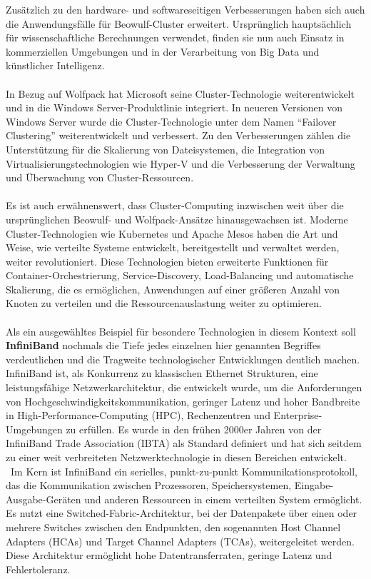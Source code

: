 Zusätzlich zu den hardware- und softwareseitigen Verbesserungen haben sich auch die Anwendungsfälle für Beowulf-Cluster erweitert. Ursprünglich hauptsächlich für wissenschaftliche Berechnungen verwendet, finden sie nun auch Einsatz in kommerziellen Umgebungen und in der Verarbeitung von Big Data und künstlicher Intelligenz.
\\\\
In Bezug auf Wolfpack hat Microsoft seine Cluster-Technologie weiterentwickelt und in die Windows Server-Produktlinie integriert. In neueren Versionen von Windows Server wurde die Cluster-Technologie unter dem Namen \enquote{Failover Clustering} weiterentwickelt und verbessert. Zu den Verbesserungen zählen die Unterstützung für die Skalierung von Dateisystemen, die Integration von Virtualisierungstechnologien wie Hyper-V und die Verbesserung der Verwaltung und Überwachung von Cluster-Ressourcen.
\\\\
Es ist auch erwähnenswert, dass Cluster-Computing inzwischen weit über die ursprünglichen Beowulf- und Wolfpack-Ansätze hinausgewachsen ist. Moderne Cluster-Technologien wie Kubernetes und Apache Mesos haben die Art und Weise, wie verteilte Systeme entwickelt, bereitgestellt und verwaltet werden, weiter revolutioniert. Diese Technologien bieten erweiterte Funktionen für Container-Orchestrierung, Service-Discovery, Load-Balancing und automatische Skalierung, die es ermöglichen, Anwendungen auf einer größeren Anzahl von Knoten zu verteilen und die Ressourcenauslastung weiter zu optimieren.
\\\\
Als ein ausgewähltes Beispiel für besondere Technologien in diesem Kontext soll \textbf{InfiniBand} nochmals die Tiefe jedes einzelnen hier genannten Begriffes verdeutlichen und die Tragweite technologischer Entwicklungen deutlich machen. InfiniBand ist, als Konkurrenz zu klassischen Ethernet Strukturen, eine leistungsfähige Netzwerkarchitektur, die entwickelt wurde, um die Anforderungen von Hochgeschwindigkeitskommunikation, geringer Latenz und hoher Bandbreite in High-Performance-Computing (HPC), Rechenzentren und Enterprise-Umgebungen zu erfüllen. Es wurde in den frühen 2000er Jahren von der InfiniBand Trade Association (IBTA) als Standard definiert und hat sich seitdem zu einer weit verbreiteten Netzwerktechnologie in diesen Bereichen entwickelt.
\\\
Im Kern ist InfiniBand ein serielles, punkt-zu-punkt Kommunikationsprotokoll, das die Kommunikation zwischen Prozessoren, Speichersystemen, Eingabe-Ausgabe-Geräten und anderen Ressourcen in einem verteilten System ermöglicht. Es nutzt eine Switched-Fabric-Architektur, bei der Datenpakete über einen oder mehrere Switches zwischen den Endpunkten, den sogenannten Host Channel Adapters (HCAs) und Target Channel Adapters (TCAs), weitergeleitet werden. Diese Architektur ermöglicht hohe Datentransferraten, geringe Latenz und Fehlertoleranz.


